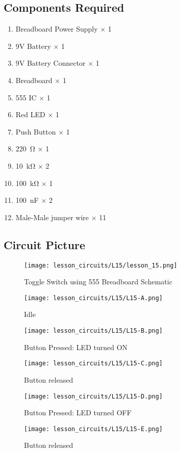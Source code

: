 \subsection{Components Required}
\begin{enumerate}
    \item Breadboard Power Supply $\times$ 1
    \item 9V Battery $\times$ 1
    \item 9V Battery Connector $\times$ 1
    \item Breadboard $\times$ 1
    \item 555 IC $\times$ 1
    \item Red LED $\times$ 1
    \item Push Button $\times$ 1
    \item \SI{220}{\ohm} $\times$ 1
    \item \SI{10}{\kilo\ohm} $\times$ 2
    \item \SI{100}{\kilo\ohm} $\times$ 1
    \item \SI{100}{\nano\farad} $\times$ 2
    \item Male-Male jumper wire $\times$ 11
\end{enumerate}
\subsection{Circuit Picture}
\begin{figure}[!hp]
    \centering
    \texttt{[image: lesson\_circuits/L15/lesson\_15.png]}
    \caption{Toggle Switch using 555 Breadboard Schematic}
    \label{fig:555_ts_sch}
\end{figure}
\begin{figure}[!hp]
    \centering
    \texttt{[image: lesson\_circuits/L15/L15-A.png]}
    \caption{Idle}
    \label{fig:555_ts_obb}
\end{figure}
\begin{figure}[!hp]
    \centering
    \texttt{[image: lesson\_circuits/L15/L15-B.png]}
    \caption{Button Pressed: LED turned ON}
    \label{fig:555_ts_obb1}
\end{figure}
\begin{figure}[!hp]
    \centering
    \texttt{[image: lesson\_circuits/L15/L15-C.png]}
    \caption{Button released}
    \label{fig:555_ts_obb2}
\end{figure}
\begin{figure}[!hp]
    \centering
    \texttt{[image: lesson\_circuits/L15/L15-D.png]}
    \caption{Button Pressed: LED turned OFF}
    \label{fig:555_ts_obb3}
\end{figure}
\begin{figure}[!hp]
    \centering
    \texttt{[image: lesson\_circuits/L15/L15-E.png]}
    \caption{Button released}
    \label{fig:555_ts_obb4}
\end{figure}
